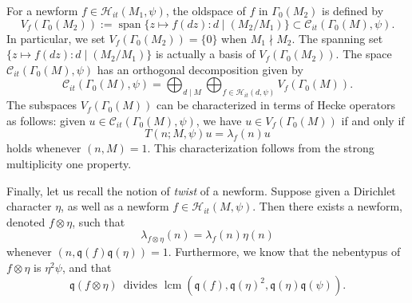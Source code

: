 \documentclass{article}
\theoremstyle{named}
\newcommand{\C}{\mathcal{C}}
\newcommand{\HH}{\mathcal{H}}
\newcommand{\q}{\mathfrak{q}}
\DeclareMathOperator{\spn}{span}
\DeclareMathOperator{\lcm}{lcm}
\begin{document}
For a newform $f \in \HH_{it}(M_1, \psi)$, the oldspace of $f$ in $\Gamma_0(M_2)$ is defined by
\begin{equation}\label{eq:oldspaceGamma0}
    V_f(\Gamma_0(M_2)) := \spn\{z \mapsto f(d z) : d \mid (M_2/M_1)\} \subset \C_{it}(\Gamma_0(M), \psi).
\end{equation}
In particular, we set $V_f(\Gamma_0(M_2)) = \{0\}$ when $M_1 \nmid M_2$. The spanning set $\{z \mapsto f(dz): d\mid (M_2/M_1)\}$ is actually a basis of $V_f(\Gamma_0(M_2))$. The space $\C_{it}(\Gamma_0(M), \psi)$ has an orthogonal decomposition given by
\begin{equation*}
    \C_{it}(\Gamma_0(M), \psi) = \bigoplus_{d\mid M}\bigoplus_{f \in \HH_{it}(d, \psi)} V_f(\Gamma_0(M)).
\end{equation*}
The subspaces $V_f(\Gamma_0(M))$ can be characterized in terms of Hecke operators as follows: given $u \in \C_{it}(\Gamma_0(M), \psi)$, we have $u \in V_f(\Gamma_0(M))$ if and only if 
\begin{equation}\label{eq:characterizationoldspace}
    T(n; M, \psi)u = \lambda_f(n)u 
\end{equation}
holds whenever $(n, M) = 1$. This characterization follows from the strong multiplicity one property. 

Finally, let us recall the notion of \emph{twist} of a newform. Suppose given a Dirichlet character $\eta$, as well as a newform $f \in \HH_{it}(M, \psi)$. Then there exists a newform, denoted $f\otimes \eta$, such that 
\begin{equation}\label{eq:heckeeigenvaluetwist}
    \lambda_{f \otimes \eta}(n) = \lambda_f(n)\eta(n) 
\end{equation}
whenever $(n, \q(f)\q(\eta)) = 1$. Furthermore, we know that the nebentypus of $f\otimes \eta$ is $\eta^2 \psi$, and that 
\begin{equation}\label{eq:conductortwist}
    \q(f\otimes \eta) \, \text{ divides } \lcm(\q(f), \q(\eta)^2, \q(\eta)\q(\psi)).
\end{equation}
\end{document}
